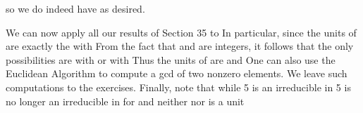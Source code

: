 \documentclass[11pt,oneside]{article}
\begin{document}
\begin{BookBody}
\noindent so we do indeed have  as desired. \BookEnd{\blacklozenge}

 We can now apply all our results of Section 35 to  In particular, since  the units of  are exactly the  with  From the fact that  and  are integers, it follows that the only possibilities are  with  or  with  Thus the units of  are  and  One can also use the Euclidean Algorithm to compute a gcd of two nonzero elements. We leave such computations to the exercises. Finally, note that while 5 is an irreducible in  5 is no longer an irreducible in  for  and neither  nor  is a unit\BookEnd{\blacktriangle}

\end{BookBody}

\BookNarrativetrue
\end{document}
